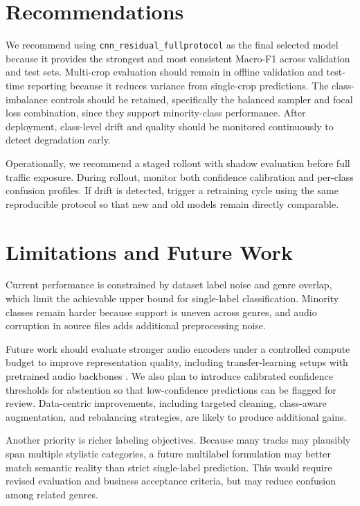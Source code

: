 \documentclass[11pt,a4paper]{article}
\begin{document}
\section{Recommendations}
We recommend using \texttt{cnn\_residual\_fullprotocol} as the final selected model because it provides the strongest and most consistent Macro-F1 across validation and test sets. Multi-crop evaluation should remain in offline validation and test-time reporting because it reduces variance from single-crop predictions. The class-imbalance controls should be retained, specifically the balanced sampler and focal loss combination, since they support minority-class performance. After deployment, class-level drift and quality should be monitored continuously to detect degradation early.

Operationally, we recommend a staged rollout with shadow evaluation before full traffic exposure. During rollout, monitor both confidence calibration and per-class confusion profiles. If drift is detected, trigger a retraining cycle using the same reproducible protocol so that new and old models remain directly comparable.

\section{Limitations and Future Work}
Current performance is constrained by dataset label noise and genre overlap, which limit the achievable upper bound for single-label classification. Minority classes remain harder because support is uneven across genres, and audio corruption in source files adds additional preprocessing noise. 

Future work should evaluate stronger audio encoders under a controlled compute budget to improve representation quality, including transfer-learning setups with pretrained audio backbones \cite{hershey2017cnn}. We also plan to introduce calibrated confidence thresholds for abstention so that low-confidence predictions can be flagged for review. Data-centric improvements, including targeted cleaning, class-aware augmentation, and rebalancing strategies, are likely to produce additional gains.

Another priority is richer labeling objectives. Because many tracks may plausibly span multiple stylistic categories, a future multilabel formulation may better match semantic reality than strict single-label prediction. This would require revised evaluation and business acceptance criteria, but may reduce confusion among related genres.
\end{document}
